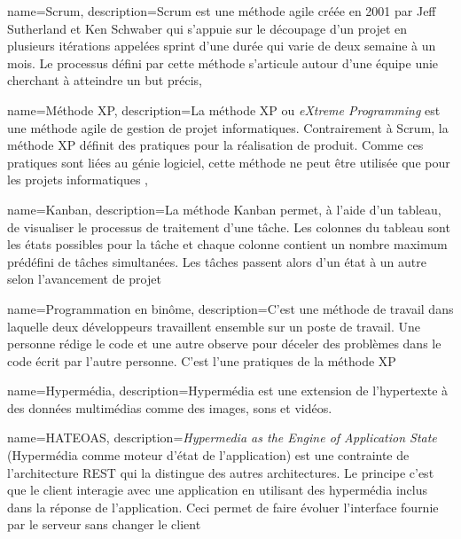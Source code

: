 \documentclass[a4paper,12pt,dvipsnames]{report}
\begin{document}




\tableofcontents
\listoffigures
\listoftables














{
	name={Scrum},
	description={Scrum est une méthode agile créée en 2001 par Jeff Sutherland et Ken Schwaber qui s'appuie sur le découpage d'un projet en plusieurs itérations appelées sprint d'une durée qui varie de deux semaine à un mois. Le processus défini par cette méthode s'articule autour d'une équipe unie cherchant à atteindre un but précis},
}

{
	name={M\'ethode XP},
	description={La méthode XP ou \textit{eXtreme Programming} est une méthode agile de gestion de projet informatiques. Contrairement à Scrum, la méthode XP définit des pratiques pour la réalisation de produit. Comme ces pratiques sont liées au génie logiciel, cette méthode ne peut être utilisée que pour les projets informatiques },
}

{
	name={Kanban},
	description={La méthode Kanban permet, à l'aide d'un tableau, de visualiser le processus de traitement d'une tâche. Les colonnes du tableau sont les états possibles pour la tâche et chaque colonne contient un nombre maximum prédéfini de tâches simultanées. Les tâches passent alors d'un état à un autre selon l'avancement de projet}
}

{
	name={Programmation en binôme},
	description={C'est une méthode de travail dans laquelle deux développeurs travaillent ensemble sur un poste de travail. Une personne rédige le code et une autre observe pour déceler des problèmes dans le code écrit par l'autre personne. C'est l'une pratiques de la méthode XP}
}

{
	name={Hyperm\'edia},
	description={Hypermédia est une extension de l'hypertexte à des données multimédias comme des images, sons et vidéos.}
}

{
	name={HATEOAS},
	description={\textit{Hypermedia as the Engine of Application State} (Hypermédia comme moteur d'état de l'application) est une contrainte de l'architecture REST qui la distingue des autres architectures. Le principe c'est que le client interagie avec une application en utilisant des hypermédia inclus dans la réponse de l'application. Ceci permet de faire évoluer l'interface fournie par le serveur sans changer le client}  
}
\end{document}
